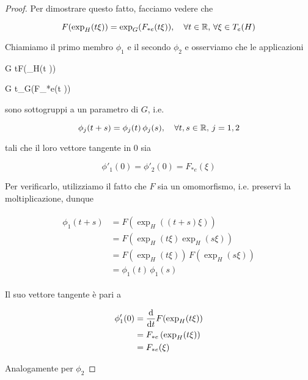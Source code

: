 \begin{proof}
	Per dimostrare questo fatto, facciamo vedere che
	
	\begin{equation}
		F(\exp_{H}(t \xi)) = \exp_{G}(F_{*e}(t \xi)) \qcomma \forall t \in \R, \, \forall \xi \in T_{e}(H)
	\end{equation}

	Chiamiamo il primo membro $ \phi_{1} $ e il secondo $ \phi_{2} $ e osserviamo che le applicazioni
	
		{\R}{G}%
		{t}{F(\exp_{H}(t \xi))}
		
		{\R}{G}%
		{t}{\exp_{G}(F_{*e}(t \xi))}
		
	sono sottogruppi a un parametro di $ G $, i.e.
	
	\begin{equation}
		\phi_{j}(t+s) = \phi_{j}(t) \, \phi_{j}(s) \qcomma \forall t,s \in \R, \, j = 1,2
	\end{equation}
	
	tali che il loro vettore tangente in $ 0 $ sia
	
	\begin{equation}
		\phi'_{1}(0) = \phi'_{2}(0) = F_{*e}(\xi)
	\end{equation}

	Per verificarlo, utilizziamo il fatto che $ F $ sia un omomorfismo, i.e. preservi la moltiplicazione, dunque
	
	\begin{align}
		\begin{split}
			\phi_{1}(t+s) &= F(\exp_{H}((t+s) \xi))\\
			&= F(\exp_{H}(t \xi) \exp_{H}(s \xi))\\
			&= F(\exp_{H}(t \xi)) \, F(\exp_{H}(s \xi))\\
			&= \phi_{1}(t) \, \phi_{1}(s)
		\end{split}
	\end{align}

	Il suo vettore tangente è pari a
	
	\begin{align}
		\begin{split}
			\phi'_{1}(0) &= \dv{t} F(\exp_{H}(t \xi))\\
			&= F_{*e} \left( \exp_{H}(t \xi) \right)\\
			&= F_{*e}(\xi)
		\end{split}
	\end{align}

	Analogamente per $ \phi_{2} $
	

\end{proof}
